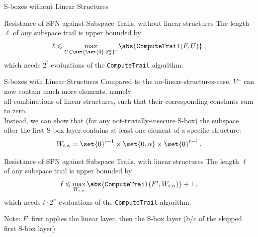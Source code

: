 \documentclass[%
    10pt,
    professionalfont,
    aspectratio=169,
    handout,
]{beamer}
\newcommand{\F}{\mathbb{F}}
\begin{document}
\begin{frame}{S-boxes without Linear Structures}
    \centering
    \begin{minipage}{0.72\textwidth}
    \begin{block}{Resistance of SPN against Subspace Trails, without linear structures}
    \centering
    The length $\ell$ of any subspace trail is upper bounded by
    \begin{equation*}
        \ell \leqslant \max_{U \in \set{\set{0}, \F_2^n}^t} \abs{\texttt{ComputeTrail}(F, U)}\;,
    \end{equation*}
    which needs $2^t$ evaluations of the \texttt{ComputeTrail} algorithm.
    \end{block}
    \end{minipage}
\end{frame}

\begin{frame}{S-boxes with Linear Structures}
    \centering
    Compared to the no-linear-structures-case, $V^\perp$ can now contain much more elements, namely\\
    all combinations of linear structures, such that their corresponding constants sum to zero.\\[1em]

    Instead, we can show that (for any not-trivially-insecure S-box) the subspace\\
    after the first S-box layer contains at least one element of a specific structure:
    \begin{equation*}
        W_{i,\alpha} = \set{0}^{i-1} \times \set{0, \alpha} \times \set{0}^{t-i}\;.
    \end{equation*}

    \begin{minipage}{0.69\textwidth}
    \begin{block}{Resistance of SPN against Subspace Trails, with linear structures}
    \centering
    The length $\ell$ of any subspace trail is upper bounded by
    \begin{equation*}
        \ell \leqslant \max_{W_{i,\alpha}} \abs{\texttt{ComputeTrail}(F^\prime, W_{i,\alpha})} + 1\;,
    \end{equation*}
    which needs $t \cdot 2^n$ evaluations of the \texttt{ComputeTrail} algorithm.
    \end{block}
    \end{minipage}

    \vspace{1em}
    Note: $F^\prime$ first applies the linear layer, then the S-box layer (b/c of the skipped first S-box layer).
\end{frame}
\end{document}
